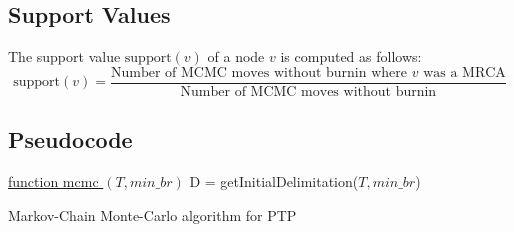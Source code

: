\documentclass{llncs}
\begin{document}
\subsection{Support Values}
The support value $\text{support}(v)$ of a node $v$ is computed as follows:
$$\text{support}(v) = \frac{\text{Number of MCMC moves without burnin where $v$ was a MRCA}}{\text{Number of MCMC moves without burnin}}$$

\subsection{Pseudocode}

\begin{algorithm}

\underline{function mcmc $(T, min\_br)$}\;
D = getInitialDelimitation($T, min\_br$)\;


\caption{Markov-Chain Monte-Carlo algorithm for PTP}

\end{algorithm}



\end{document}
